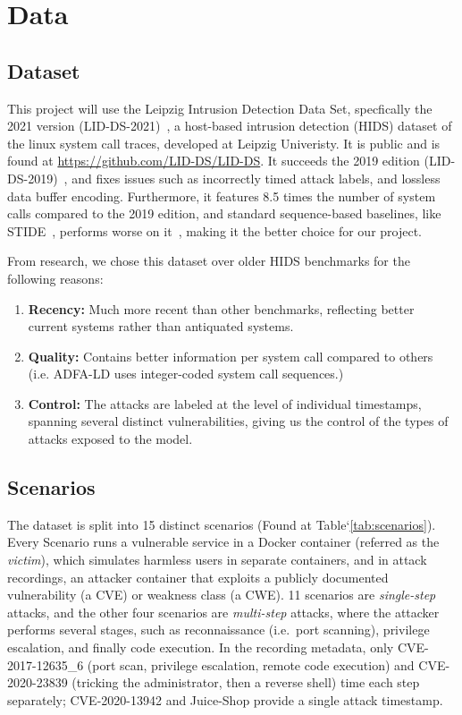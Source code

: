 \documentclass{article}
\begin{document}
\section{Data}
\label{data}
\subsection{Dataset}
This project will use the Leipzig Intrusion Detection Data Set, specfically the 2021 version (LID-DS-2021)~\citet{grimmer2023lidds2021}, a host-based intrusion detection (HIDS) dataset of the linux system call traces, developed at Leipzig Univeristy. It is public and is found at \url{https://github.com/LID-DS/LID-DS}. It succeeds the 2019 edition (LID-DS-2019)~\citet{grimmer2019lidds}, and fixes issues such as incorrectly timed attack labels, and lossless data buffer encoding. Furthermore, it features 8.5 times the number of system calls compared to the 2019 edition, and standard sequence-based baselines, like STIDE~\citep{hofmeyr1998stide}, performs worse on it~\citep{grimmer2023lidds2021}, making it the better choice for our project.

From research, we chose this dataset over older HIDS benchmarks for the following reasons:
\begin{enumerate}
    \item \textbf{Recency:} Much more recent than other benchmarks, reflecting better current systems rather than antiquated systems.
    \item \textbf{Quality:} Contains better information per system call compared to others (i.e. ADFA-LD uses integer-coded system call sequences.)
    \item \textbf{Control:} The attacks are labeled at the level of individual timestamps, spanning several distinct vulnerabilities, giving us the control of the types of attacks exposed to the model.
\end{enumerate}

\subsection{Scenarios}
\label{data:scenarios}
The dataset is split into 15 distinct scenarios (Found at Table`\ref{tab:scenarios}). Every Scenario runs a vulnerable service in a Docker container (referred as the \emph{victim}), which simulates harmless users in separate containers, and in attack recordings, an attacker container that exploits a publicly documented vulnerability (a CVE) or weakness class (a CWE). 11 scenarios are \emph{single-step} attacks, and the other four scenarios are \emph{multi-step} attacks, where the attacker performs several stages, such as reconnaissance (i.e.\ port scanning), privilege escalation, and finally code execution. In the recording metadata, only CVE-2017-12635\_6 (port scan, privilege escalation, remote code execution) and CVE-2020-23839 (tricking the administrator, then a reverse shell) time each step separately; CVE-2020-13942 and Juice-Shop provide a single attack timestamp.
\end{document}
